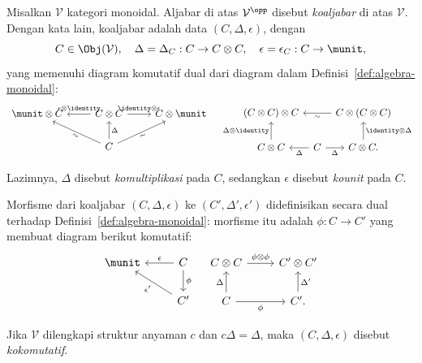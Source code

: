 \begin{definition}[Koaljabar]\label{def:cogebra-monoidal}
	Misalkan $\mathcal{V}$ kategori monoidal. Aljabar di atas
	$\mathcal{V}^{\opp}$ disebut \emph{koaljabar} di atas $\mathcal{V}$.
	Dengan kata lain, koaljabar adalah data $(C,\Delta,\epsilon)$, dengan
	\[ C \in \Obj(\mathcal{V}), \quad \Delta = \Delta_C: C \to C \otimes C, \quad \epsilon = \epsilon_C: C \to \munit, \]
	yang memenuhi diagram komutatif dual dari diagram dalam
	Definisi~\ref{def:algebra-monoidal}:
	\[\begin{tikzcd}
			\munit \otimes C & C \otimes C \arrow[r, "{\identity \otimes \epsilon}"] \arrow[l, "{\epsilon \otimes \identity}"'] & C \otimes \munit \\
			& C \arrow[lu, "\sim"' sloped] \arrow[ru, "\sim"' sloped] \arrow[u, "\Delta"'] &
		\end{tikzcd} \quad
	\begin{tikzcd}[column sep=tiny]
		(C \otimes C) \otimes C & & C \otimes (C \otimes C) \arrow[ll, "\sim"] \\
		C \otimes C \arrow[u, "{\Delta \otimes \identity}"] & C \arrow[l, "\Delta"] \arrow[r, "\Delta"'] & C \otimes C . \arrow[u, "{\identity \otimes \Delta}"']
	\end{tikzcd}\]

	Lazimnya, $\Delta$ disebut \emph{komultiplikasi} pada $C$, sedangkan
	$\epsilon$ disebut \emph{kounit} pada $C$.

	Morfisme dari koaljabar $(C,\Delta,\epsilon)$ ke
	$(C',\Delta',\epsilon')$ didefinisikan secara dual terhadap
	Definisi~\ref{def:algebra-monoidal}: morfisme itu adalah
	$\phi:C\to C'$ yang membuat diagram berikut komutatif:
	\[\begin{tikzcd}
		\munit & C \arrow[d, "\phi"] \arrow[l, "\epsilon"']  \\
		& C' \arrow[lu, "{\epsilon'}"]
	\end{tikzcd} \quad \begin{tikzcd}
		C \otimes C \arrow[r, "{\phi \otimes \phi}"] & C' \otimes C' \\
		C \arrow[r, "\phi"'] \arrow[u, "\Delta"] & C' . \arrow[u, "{\Delta'}"']
	\end{tikzcd}\]

	Jika $\mathcal{V}$ dilengkapi struktur anyaman $c$ dan $c\Delta=\Delta$,
	maka $(C,\Delta,\epsilon)$ disebut \emph{kokomutatif}.
\end{definition}

